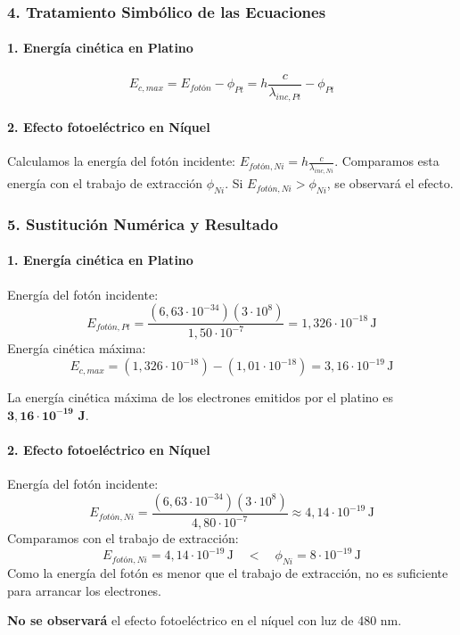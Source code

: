 \subsubsection*{4. Tratamiento Simbólico de las Ecuaciones}
\paragraph*{1. Energía cinética en Platino}
$$E_{c,max} = E_{fotón} - \phi_{Pt} = h\frac{c}{\lambda_{inc,Pt}} - \phi_{Pt}$$
\paragraph*{2. Efecto fotoeléctrico en Níquel}
Calculamos la energía del fotón incidente: $E_{fotón,Ni} = h\frac{c}{\lambda_{inc,Ni}}$.
Comparamos esta energía con el trabajo de extracción $\phi_{Ni}$. Si $E_{fotón,Ni} > \phi_{Ni}$, se observará el efecto.

\subsubsection*{5. Sustitución Numérica y Resultado}
\paragraph*{1. Energía cinética en Platino}
Energía del fotón incidente:
$$E_{fotón,Pt} = \frac{(6,63\cdot10^{-34})(3\cdot10^8)}{1,50\cdot10^{-7}} = 1,326 \cdot 10^{-18} \, \text{J}$$
Energía cinética máxima:
$$E_{c,max} = (1,326 \cdot 10^{-18}) - (1,01 \cdot 10^{-18}) = 3,16 \cdot 10^{-19} \, \text{J}$$
\begin{cajaresultado}
    La energía cinética máxima de los electrones emitidos por el platino es $\boldsymbol{3,16 \cdot 10^{-19}}$ \textbf{J}.
\end{cajaresultado}

\paragraph*{2. Efecto fotoeléctrico en Níquel}
Energía del fotón incidente:
$$E_{fotón,Ni} = \frac{(6,63\cdot10^{-34})(3\cdot10^8)}{4,80\cdot10^{-7}} \approx 4,14 \cdot 10^{-19} \, \text{J}$$
Comparamos con el trabajo de extracción:
$$E_{fotón,Ni} = 4,14 \cdot 10^{-19} \, \text{J} \quad < \quad \phi_{Ni} = 8 \cdot 10^{-19} \, \text{J}$$
Como la energía del fotón es menor que el trabajo de extracción, no es suficiente para arrancar los electrones.
\begin{cajaresultado}
    \textbf{No se observará} el efecto fotoeléctrico en el níquel con luz de 480 nm.
\end{cajaresultado}

